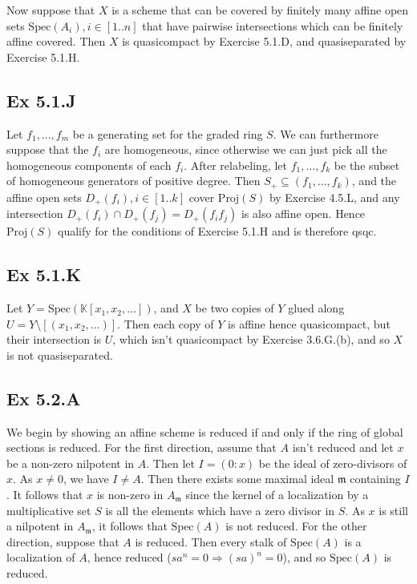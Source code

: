 \documentclass{article}
\theoremstyle{definition}
\newcommand{\K}{\mathbb{K}}
\newcommand{\Spec}{\text{Spec}}
\newcommand{\Proj}{\text{Proj}}
\begin{document}
Now suppose that $X$ is a scheme that can be covered by finitely many affine
open sets $\Spec(A_i), i \in [1..n]$ that have pairwise intersections which can
be finitely affine covered. Then $X$ is quasicompact by Exercise 5.1.D, and
quasiseparated by Exercise 5.1.H.

\subsection*{Ex 5.1.J}

Let $f_1, \ldots, f_m$ be a generating set for the graded ring $S$. We can
furthermore suppose that the $f_i$ are homogeneous, since otherwise we can just
pick all the homogeneous components of each $f_i$. After relabeling, let $f_1,
\ldots, f_k$ be the subset of homogeneous generators of positive degree. Then
$S_{+} \subseteq (f_1, \ldots, f_k)$, and the affine open sets $D_{+}(f_i), i
\in [1..k]$ cover $\Proj(S)$ by Exercise 4.5.L, and any intersection
$D_{+}(f_i) \cap D_{+}(f_j) = D_{+}(f_i f_j)$ is also affine open. Hence
$\Proj(S)$ qualify for the conditions of Exercise 5.1.H and is therefore qsqc.

\subsection*{Ex 5.1.K}

Let $Y = \Spec(\K[x_1,x_2,\ldots])$, and $X$ be two copies of $Y$ glued along
$U = Y \setminus [(x_1, x_2, \ldots)]$. Then each copy of $Y$ is affine hence
quasicompact, but their intersection is $U$, which isn't quasicompact by
Exercise 3.6.G.(b), and so $X$ is not quasiseparated.


\subsection*{Ex 5.2.A}

We begin by showing an affine scheme is reduced if and only if the ring of
global sections is reduced. For the first direction, assume that $A$ isn't
reduced and let $x$ be a non-zero nilpotent in $A$. Then let $I = (0 : x)$ be
the ideal of zero-divisors of $x$. As $x \not = 0$, we have $I \not = A$. Then
there exists some maximal ideal $\mathfrak{m}$ containing $I$. It follows that
$x$ is non-zero in $A_{\mathfrak{m}}$ since the kernel of a localization by a
multiplicative set $S$ is all the elements which have a zero divisor in $S$. As
$x$ is still a nilpotent in $A_{\mathfrak{m}}$, it follows that $\Spec(A)$ is
not reduced. For the other direction, suppose that $A$ is reduced. Then every
stalk of $\Spec(A)$ is a localization of $A$, hence reduced ($sa^n = 0
\Rightarrow (sa)^n = 0$), and so $\Spec(A)$ is reduced. \\
\end{document}
